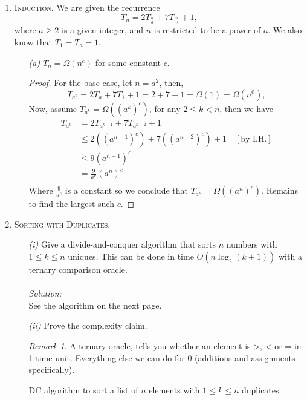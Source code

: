 \documentclass[12pt]{article}
\theoremstyle{definition}
\theoremstyle{remark}
\newtheorem*{remark}{Remark}
\newcommand\sol{%
  \\ 
  \\
  \textit{Solution:}\\%
}
\begin{document}
\begin{enumerate}
\newpage 
  \item \textsc{Induction.} We are given the recurrence 
  $$T_n = 2 T_{\frac{n}{a}} + 7 T_{\frac{n}{a^2}} + 1,$$
  where $a \geq 2$ is a given integer, and $n$ is restricted to be a power of $a$. We also know that $T_1 = T_a = 1$.\newline
  \begin{enumerate}
    \item[\it (a)] $T_n = \Omega(n^c)$ for some constant $c.$
\begin{proof} For the base case, let $n = a^2$, then, 
  $$T_{a^2} = 2 T_a + 7T_1 + 1 = 2 + 7  + 1 = \Omega(1) = \Omega(n^0), $$
  Now, assume $T_{a^k} = \Omega ((a^k)^c)$, for any $2\leq k < n$, then we have 
  \begin{equation*}
    \begin{split}
      T_{a^n} &= 2 T_{a^{n-1}} + 7T_{a^{n-2}} + 1\\ 
      &\leq 2 ((a^{n-1})^c) + 7((a^{n-2})^c) + 1 \quad [\text{by I.H.}]\\ 
      & \leq 9 (a^{n-1})^c \\
      & = \frac{9}{a^c} \left( a^n\right)^c \\ 
    \end{split}
  \end{equation*}
  Where $\frac{9}{a^c} $ is a constant so we conclude that $T_{a^n} = \Omega ((a^n)^c)$. Remains to find the largest such $c.$
\end{proof}
  \end{enumerate}
  \newpage
  \item  \textsc{Sorting with Duplicates.} \begin{enumerate}
    \item[\it (i)] Give a divide-and-conquer algorithm that sorts $n$ numbers with $1\leq k\leq n$ uniques. This can be done in time $O(n \log_2(k + 1))$ with a ternary comparison oracle. 
    \sol See the algorithm on the next page.
   \item[\it (ii)] Prove the complexity claim.
\begin{remark} 
    A ternary oracle, tells you whether an element is >, < or = in 1 time unit. Everything else we can do for 0 (additions and assignments specifically).
\end{remark}
  \begin{algorithm}
    \caption{DC algorithm to sort a list of $n$ elements with $1\leq k\leq n$ duplicates. }
    \BlankLine
    \BlankLine


\end{algorithm}
\end{enumerate}
\end{enumerate}
\end{document}
